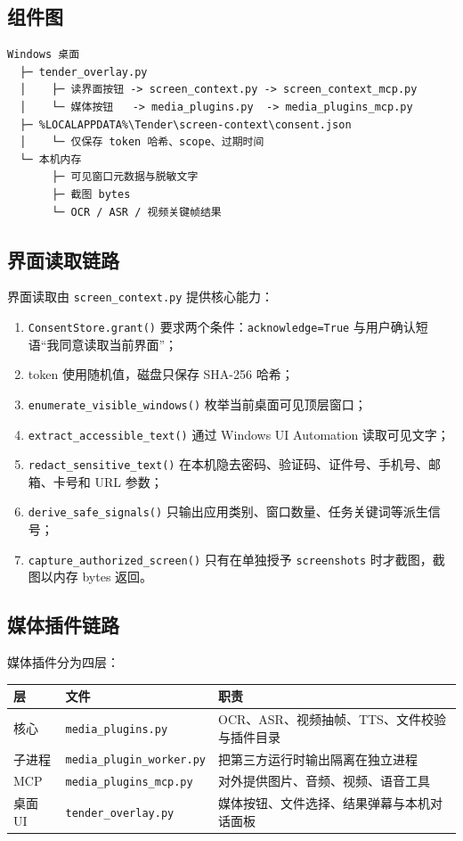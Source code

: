 \documentclass[UTF8,a4paper,11pt]{ctexart}
\begin{document}
\subsection{组件图}

\begin{verbatim}
Windows 桌面
  ├─ tender_overlay.py
  │    ├─ 读界面按钮 -> screen_context.py -> screen_context_mcp.py
  │    └─ 媒体按钮   -> media_plugins.py  -> media_plugins_mcp.py
  ├─ %LOCALAPPDATA%\Tender\screen-context\consent.json
  │    └─ 仅保存 token 哈希、scope、过期时间
  └─ 本机内存
       ├─ 可见窗口元数据与脱敏文字
       ├─ 截图 bytes
       └─ OCR / ASR / 视频关键帧结果
\end{verbatim}

\subsection{界面读取链路}

界面读取由 \texttt{screen\_context.py} 提供核心能力：

\begin{enumerate}
\item \texttt{ConsentStore.grant()} 要求两个条件：\texttt{acknowledge=True} 与用户确认短语“我同意读取当前界面”；
\item token 使用随机值，磁盘只保存 SHA-256 哈希；
\item \texttt{enumerate\_visible\_windows()} 枚举当前桌面可见顶层窗口；
\item \texttt{extract\_accessible\_text()} 通过 Windows UI Automation 读取可见文字；
\item \texttt{redact\_sensitive\_text()} 在本机隐去密码、验证码、证件号、手机号、邮箱、卡号和 URL 参数；
\item \texttt{derive\_safe\_signals()} 只输出应用类别、窗口数量、任务关键词等派生信号；
\item \texttt{capture\_authorized\_screen()} 只有在单独授予 \texttt{screenshots} 时才截图，截图以内存 bytes 返回。
\end{enumerate}

\subsection{媒体插件链路}

媒体插件分为四层：

\begin{longtable}{@{}p{3.1cm}p{4.6cm}p{5.5cm}@{}}
\toprule
\textbf{层} & \textbf{文件} & \textbf{职责} \\
\midrule
核心 & \texttt{media\_plugins.py} & OCR、ASR、视频抽帧、TTS、文件校验与插件目录 \\
子进程 & \texttt{media\_plugin\_worker.py} & 把第三方运行时输出隔离在独立进程 \\
MCP & \texttt{media\_plugins\_mcp.py} & 对外提供图片、音频、视频、语音工具 \\
桌面 UI & \texttt{tender\_overlay.py} & 媒体按钮、文件选择、结果弹幕与本机对话面板 \\
\bottomrule
\end{longtable}
\end{document}
